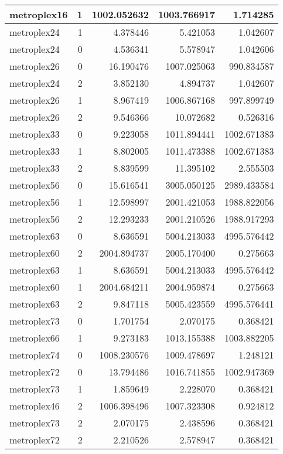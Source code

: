 \documentclass[../../../thesis.tex]{subfiles}
\begin{document}
\begin{longtable}{|l|r|r|r|r|}
metroplex16 & 1 & 1002.052632 & 1003.766917 & 1.714285 \\\hline
metroplex24 & 1 & 4.378446 & 5.421053 & 1.042607 \\\hline
metroplex24 & 0 & 4.536341 & 5.578947 & 1.042606 \\\hline
metroplex26 & 0 & 16.190476 & 1007.025063 & 990.834587 \\\hline
metroplex24 & 2 & 3.852130 & 4.894737 & 1.042607 \\\hline
metroplex26 & 1 & 8.967419 & 1006.867168 & 997.899749 \\\hline
metroplex26 & 2 & 9.546366 & 10.072682 & 0.526316 \\\hline
metroplex33 & 0 & 9.223058 & 1011.894441 & 1002.671383 \\\hline
metroplex33 & 1 & 8.802005 & 1011.473388 & 1002.671383 \\\hline
metroplex33 & 2 & 8.839599 & 11.395102 & 2.555503 \\\hline
metroplex56 & 0 & 15.616541 & 3005.050125 & 2989.433584 \\\hline
metroplex56 & 1 & 12.598997 & 2001.421053 & 1988.822056 \\\hline
metroplex56 & 2 & 12.293233 & 2001.210526 & 1988.917293 \\\hline
metroplex63 & 0 & 8.636591 & 5004.213033 & 4995.576442 \\\hline
metroplex60 & 2 & 2004.894737 & 2005.170400 & 0.275663 \\\hline
metroplex63 & 1 & 8.636591 & 5004.213033 & 4995.576442 \\\hline
metroplex60 & 1 & 2004.684211 & 2004.959874 & 0.275663 \\\hline
metroplex63 & 2 & 9.847118 & 5005.423559 & 4995.576441 \\\hline
metroplex73 & 0 & 1.701754 & 2.070175 & 0.368421 \\\hline
metroplex66 & 1 & 9.273183 & 1013.155388 & 1003.882205 \\\hline
metroplex74 & 0 & 1008.230576 & 1009.478697 & 1.248121 \\\hline
metroplex72 & 0 & 13.794486 & 1016.741855 & 1002.947369 \\\hline
metroplex73 & 1 & 1.859649 & 2.228070 & 0.368421 \\\hline
metroplex46 & 2 & 1006.398496 & 1007.323308 & 0.924812 \\\hline
metroplex73 & 2 & 2.070175 & 2.438596 & 0.368421 \\\hline
metroplex72 & 2 & 2.210526 & 2.578947 & 0.368421 \\\hline

\end{longtable}
\end{document}
